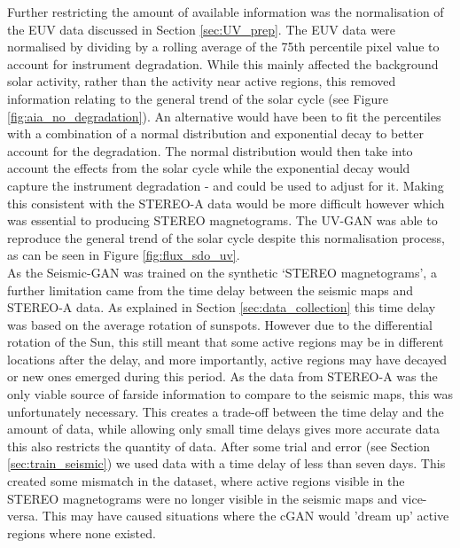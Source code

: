 \documentclass[11pt,a4paper,onecolumn]{report}
\begin{document}
Further restricting the amount of available information was the normalisation of
the EUV data discussed in Section \ref{sec:UV_prep}. The EUV data were
normalised by dividing by a rolling average of the 75th percentile pixel value
to account for instrument degradation. While this mainly affected the background
solar activity, rather than the activity near active regions, this removed
information relating to the general trend of the solar cycle (see Figure
\ref{fig:aia_no_degradation}). An alternative would have been to fit the
percentiles with a combination of a normal distribution and exponential decay to
better account for the degradation. The normal distribution would then take into
account the effects from the solar cycle while the exponential decay would
capture the instrument degradation - and could be used to adjust for it. Making
this consistent with the STEREO-A data would be more difficult however which
was essential to producing STEREO magnetograms. The UV-GAN was able to reproduce
the general trend of the solar cycle despite this normalisation process, as can
be seen in Figure \ref{fig:flux_sdo_uv}. \\


As the Seismic-GAN was trained on the synthetic `STEREO magnetograms', a further
limitation came from the time delay between the seismic maps and STEREO-A data.
As explained in Section \ref{sec:data_collection} this time delay was based on
the average rotation of sunspots. However due to the differential rotation of
the Sun, this still meant that some active regions may be in different locations
after the delay, and more importantly, active regions may have decayed or new
ones emerged during this period. As the data from STEREO-A was the only viable
source of farside information to compare to the seismic maps, this was
unfortunately necessary. This creates a trade-off between the time delay and the
amount of data, while allowing only small time delays gives more accurate data
this also restricts the quantity of data. After some trial and error (see
Section \ref{sec:train_seismic}) we used data with a time delay of less than
seven days. This created some mismatch in the dataset, where active regions
visible in the STEREO magnetograms were no longer visible in the seismic maps
and vice-versa. This may have caused situations where the cGAN would 'dream up'
active regions where none existed. \\
\end{document}
